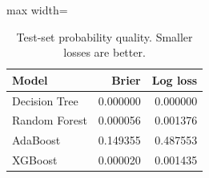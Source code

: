 \begin{table}[H]
\centering\small
\caption{Test-set probability quality. Smaller losses are better.}
\begin{adjustbox}{max width=\linewidth}\begin{tabular}{lrr}
\toprule
Model & Brier & Log loss \\
\midrule
Decision Tree & 0.000000 & 0.000000 \\
Random Forest & 0.000056 & 0.001376 \\
AdaBoost & 0.149355 & 0.487553 \\
XGBoost & 0.000020 & 0.001435 \\
\bottomrule
\end{tabular}\end{adjustbox}
\end{table}
